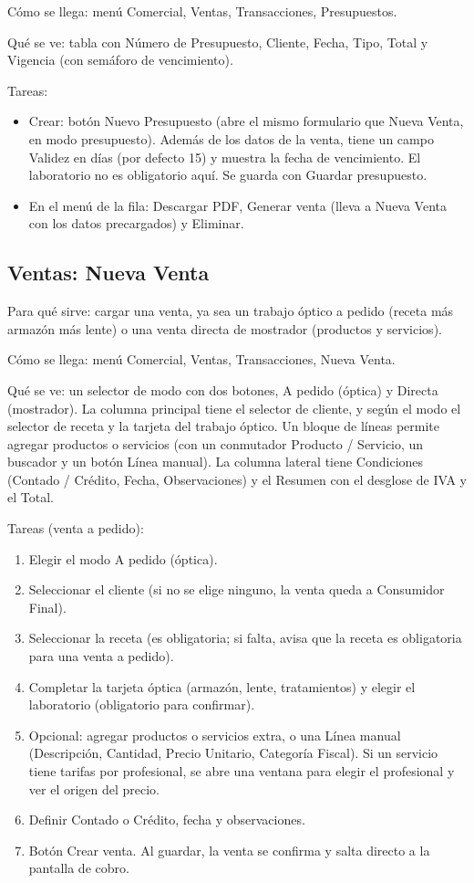 Cómo se llega: menú Comercial, Ventas, Transacciones, Presupuestos.

Qué se ve: tabla con Número de Presupuesto, Cliente, Fecha, Tipo, Total y Vigencia (con semáforo de vencimiento).

Tareas:
\begin{itemize}
  \item Crear: botón Nuevo Presupuesto (abre el mismo formulario que Nueva Venta, en modo presupuesto). Además de los datos de la venta, tiene un campo Validez en días (por defecto 15) y muestra la fecha de vencimiento. El laboratorio no es obligatorio aquí. Se guarda con Guardar presupuesto.
  \item En el menú de la fila: Descargar PDF, Generar venta (lleva a Nueva Venta con los datos precargados) y Eliminar.
\end{itemize}

\subsection{Ventas: Nueva Venta}
\label{sec:mu-ventas-nueva}

Para qué sirve: cargar una venta, ya sea un trabajo óptico a pedido (receta más armazón más lente) o una venta directa de mostrador (productos y servicios).

Cómo se llega: menú Comercial, Ventas, Transacciones, Nueva Venta.

Qué se ve: un selector de modo con dos botones, A pedido (óptica) y Directa (mostrador). La columna principal tiene el selector de cliente, y según el modo el selector de receta y la tarjeta del trabajo óptico. Un bloque de líneas permite agregar productos o servicios (con un conmutador Producto / Servicio, un buscador y un botón Línea manual). La columna lateral tiene Condiciones (Contado / Crédito, Fecha, Observaciones) y el Resumen con el desglose de IVA y el Total.

Tareas (venta a pedido):
\begin{enumerate}
  \item Elegir el modo A pedido (óptica).
  \item Seleccionar el cliente (si no se elige ninguno, la venta queda a Consumidor Final).
  \item Seleccionar la receta (es obligatoria; si falta, avisa que la receta es obligatoria para una venta a pedido).
  \item Completar la tarjeta óptica (armazón, lente, tratamientos) y elegir el laboratorio (obligatorio para confirmar).
  \item Opcional: agregar productos o servicios extra, o una Línea manual (Descripción, Cantidad, Precio Unitario, Categoría Fiscal). Si un servicio tiene tarifas por profesional, se abre una ventana para elegir el profesional y ver el origen del precio.
  \item Definir Contado o Crédito, fecha y observaciones.
  \item Botón Crear venta. Al guardar, la venta se confirma y salta directo a la pantalla de cobro.
\end{enumerate}

